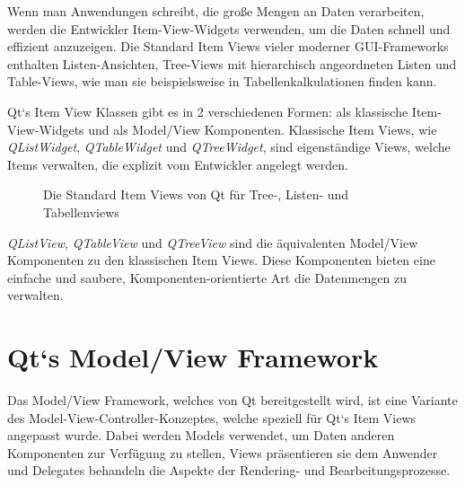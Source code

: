 \documentclass[11pt,a4paper,titlepage]{scrreprt}
\begin{document}
Wenn man Anwendungen schreibt, die große Mengen an Daten verarbeiten, werden die
Entwickler Item-View-Widgets verwenden, um die Daten schnell und effizient anzuzeigen.
Die Standard Item Views vieler moderner GUI-Frameworks enthalten Listen-Ansichten,
Tree-Views mit hierarchisch angeordneten Listen und Table-Views, wie man sie 
beispielsweise in Tabellenkalkulationen finden kann.

Qt`s Item View Klassen gibt es in 2 verschiedenen Formen: als klassische Item-View-Widgets
und als Model/View Komponenten. Klassische Item Views, wie {\itshape QListWidget}, 
{\itshape QTableWidget} und {\itshape QTreeWidget}, sind eigenständige Views, welche Items
verwalten, die explizit vom Entwickler angelegt werden.

\enlargethispage{1cm}
\begin{figure}[h]
\caption{Die Standard Item Views von Qt für Tree-, Listen- und Tabellenviews}
\end{figure}

{\itshape QListView}, {\itshape QTableView} und {\itshape QTreeView} sind die äquivalenten
Model/View Komponenten zu den klassischen Item Views. Diese Komponenten bieten eine
einfache und saubere, Komponenten-orientierte Art die Datenmengen zu verwalten.

\section{Qt`s Model/View Framework}
Das Model/View Framework, welches von Qt bereitgestellt wird, ist eine Variante des
Model-View-Controller-Konzeptes, welche speziell für Qt`s Item Views angepasst wurde.
Dabei werden Models verwendet, um Daten anderen Komponenten zur Verfügung zu stellen,
Views präsentieren sie dem Anwender und Delegates behandeln die Aspekte der
Rendering- und Bearbeitungsprozesse.
\end{document}
